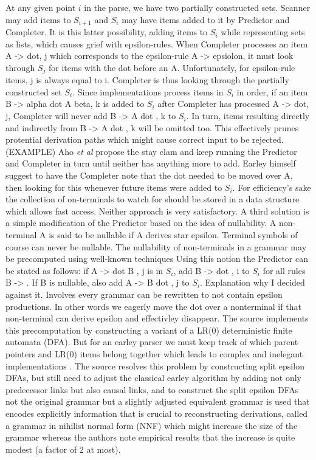 \begin{isabellebody}
\begin{isamarkuptext}
At any given point $i$ in the parse, we have two partially constructed sets. Scanner may add items to
$S_{i+1}$ and $S_i$ may have items added to it by Predictor and Completer. It is this latter possibility,
adding items to $S_i$ while representing sets as lists, which causes grief with epsilon-rules.
When Completer processes an item A -> dot, j which corresponds to the epsilon-rule A -> epsiolon, it must
look through $S_j$ for items with the dot before an A. Unfortunately, for epsilon-rule items, j is always
equal to i. Completer is thus looking through the partially constructed set $S_i$. Since implementations
process items in $S_i$ in order, if an item B -> alpha dot A beta, k is added to $S_i$ after Completer
has processed A -> dot, j, Completer will never add B -> \alpha A dot \beta, k to $S_i$. In turn, items
resulting directly and indirectly from B -> \alpha A dot \beta, k will be omitted too. This effectively
prunes protential derivation paths which might cause correct input to be rejected. (EXAMPLE)
Aho \textit{et al} \cite{Aho:1972} propose the stay clam and keep running the Predictor and Completer
in turn until neither has anything more to add. Earley himself suggest to have the Completer note that
the dot needed to be moved over A, then looking for this whenever future items were added to $S_i$.
For efficiency's sake the collection of on-terminals to watch for should be stored in a data structure
which allows fast access. Neither approach is very satisfactory. A third solution \cite{Aycoack:2002}
is a simple modification of the Predictor based on the idea of nullability. A non-terminal A is said to be
nullable if A derives star epsilon. Terminal symbols of course can never be nullable. The nullability of
non-terminals in a grammar may be precomputed using well-known techniques \cite{Appel:2003} \cite{Fischer:2009}
Using this notion the Predictor can be stated as follows: if A -> \alpha dot B \beta, j is in $S_i$,
add B -> dot \gamma, i to $S_i$ for all rules B -> \gamma. If B is nullable, also add A -> \alpha B dot \beta, j
to $S_i$. Explanation why I decided against it. Involves every grammar can be rewritten to not contain epsilon
productions. In other words we eagerly move the dot over a nonterminal if that non-terminal can derive epsilon
and effectivley disappear. The source implements this precomputation by constructing a variant of 
a LR(0) deterministic finite automata (DFA). But for an earley parser we must keep track of which parent
pointers and LR(0) items belong together which leads to complex and inelegant implementations \cite{McLean:1996}.
The source resolves this problem by constructing split epsilon DFAs, but still need to adjust the classical
earley algorithm by adding not only predecessor links but also causal links, and to construct the split
epsilon DFAs not the original grammar but a slightly adjusted equivalent grammar is used that encodes
explicitly information that is crucial to reconstructing derivations, called a grammar in nihilist normal form (NNF)
which might increase the size of the grammar whereas the authors note empirical results that the increase
is quite modest (a factor of 2 at most).


\end{isamarkuptext}
\end{isabellebody}
